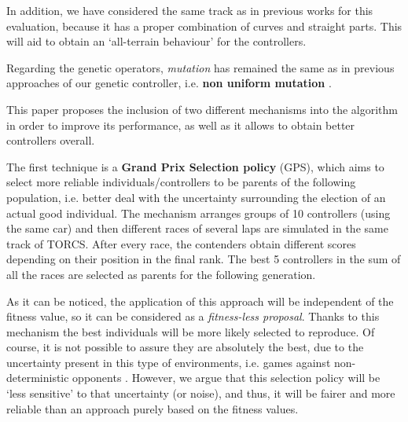 \documentclass[10pt,journal,compsoc]{IEEEtran}
\begin{document}
In addition, we have considered the same track as in previous works \cite{salem_cig2018} for this evaluation, because it has a proper combination of curves and straight parts. This will aid to obtain an `all-terrain behaviour' for the controllers.

Regarding the genetic operators, \textit{mutation} has remained the same as in previous approaches of our genetic controller, i.e. \textbf{non uniform mutation} \cite{mutation1997}. 






This paper proposes the inclusion of two different mechanisms into the algorithm in order to improve its performance, as well as it allows to obtain better controllers overall.

The first technique is a \textbf{Grand Prix Selection policy} (GPS), which aims to select more reliable individuals/controllers to be parents of the following population, i.e. better deal with the uncertainty surrounding the election of an actual good individual. The mechanism arranges groups of 10 controllers (using the same car) and then different races of several laps are simulated in the same track of TORCS. After every race, the contenders obtain different scores depending on their position in the final rank. The best 5 controllers in the sum of all the races are selected as parents for the following generation. 

As it can be noticed, the application of this approach will be independent of the fitness value, so it can be considered as a \textit{fitness-less proposal}.
Thanks to this mechanism the best individuals will be more likely selected to reproduce. Of course, it is not possible to assure they are absolutely the best, due to the uncertainty present in this type of environments, i.e. games against non-deterministic opponents \cite{merelo2016statistical}. However, we argue that this selection policy will be `less sensitive' to that uncertainty (or noise), and thus, it will be fairer and more reliable than an approach purely based on the fitness values. 
\end{document}
